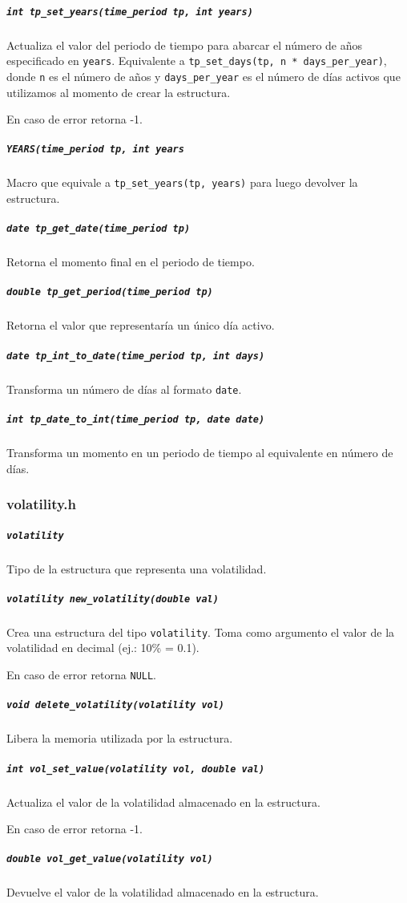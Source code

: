 \documentclass[12pt,a4paper,final]{article}
\begin{document}
			\subparagraph{\texttt{int tp\_set\_years(time\_period tp, int years)}}
				Actualiza el valor del periodo de tiempo para abarcar el número de años
				especificado en \texttt{years}. Equivalente a
				\texttt{tp\_set\_days(tp, n * days\_per\_year)}, donde \texttt{n}
				es el número de años y \texttt{days\_per\_year} es el número de días
				activos que utilizamos al momento de crear la estructura.

				En caso de error retorna -1.

			\subparagraph{\texttt{YEARS(time\_period tp, int years}}
				Macro que equivale a \texttt{tp\_set\_years(tp, years)} para luego devolver
				la estructura.

			\subparagraph{\texttt{date tp\_get\_date(time\_period tp)}}
				Retorna el momento final en el periodo de tiempo.

			\subparagraph{\texttt{double tp\_get\_period(time\_period tp)}}
				Retorna el valor que representaría un único día activo.

			\subparagraph{\texttt{date tp\_int\_to\_date(time\_period tp, int days)}}
				Transforma un número de días al formato \texttt{date}.

			\subparagraph{\texttt{int tp\_date\_to\_int(time\_period tp, date date)}}
				Transforma un momento en un periodo de tiempo al equivalente en número de días.

		\subsubsection{volatility.h}

			\subparagraph{\texttt{volatility}}
				Tipo de la estructura que representa una volatilidad.

			\subparagraph{\texttt{volatility new\_volatility(double val)}}
				Crea una estructura del tipo \texttt{volatility}. Toma como argumento
				el valor de la volatilidad en decimal (ej.: 10\% = 0.1).

				En caso de error retorna \texttt{NULL}.

			\subparagraph{\texttt{void delete\_volatility(volatility vol)}}
				Libera la memoria utilizada por la estructura.

			\subparagraph{\texttt{int vol\_set\_value(volatility vol, double val)}}
				Actualiza el valor de la volatilidad almacenado en la estructura.

				En caso de error retorna -1.

			\subparagraph{\texttt{double vol\_get\_value(volatility vol)}}
				Devuelve el valor de la volatilidad almacenado en la estructura.
\end{document}
